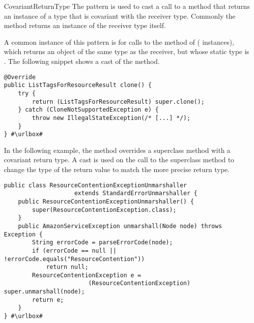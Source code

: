 \begin{pattern}{CovariantReturnType}
The \thisp{} pattern is used to cast a call to a method that returns
an instance of a type that is covariant with the receiver type.
Commonly the method returns an instance of the receiver type itself.

\instances{}
A common instance of this pattern is for calls to the  method of  (\nCovariantReturnTypeCloneSubpattern{} instances),
which returns an object of the same type as the receiver,
but whose static type is .
The following snippet shows a cast of the  method.

\def\urlvar{http://bit.ly/aws_aws_sdk_java_2GvHhYt}
\begin{verbatim}
@Override
public ListTagsForResourceResult clone() {
    try {
        return (ListTagsForResourceResult) super.clone();
    } catch (CloneNotSupportedException e) {
        throw new IllegalStateException(/* [...] */);
    }
} #\urlbox#
\end{verbatim}

In the following example,
the  method overrides a superclass method with a covariant return type.
A cast is used on the call to the superclass method to change the type of the return value to match the more precise return type.

\def\urlvar{http://bit.ly/aws_amplify_aws_sdk_android_2FVWl13}
\begin{verbatim}
public class ResourceContentionExceptionUnmarshaller
                    extends StandardErrorUnmarshaller {
    public ResourceContentionExceptionUnmarshaller() {
        super(ResourceContentionException.class);
    }
    public AmazonServiceException unmarshall(Node node) throws Exception {
        String errorCode = parseErrorCode(node);
        if (errorCode == null || !errorCode.equals("ResourceContention"))
            return null;
        ResourceContentionException e =
                        (ResourceContentionException) super.unmarshall(node);
        return e;
    }
} #\urlbox#
\end{verbatim}


\end{pattern}

